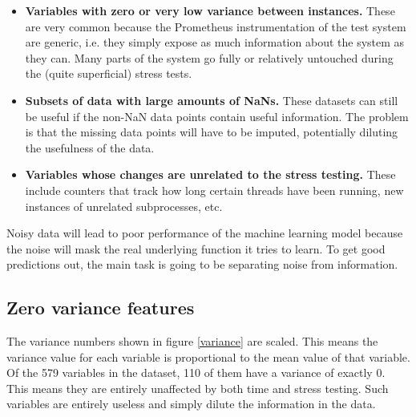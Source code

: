 \begin{itemize}
    \item \textbf{Variables with zero or very low variance between instances.} These are very common because the Prometheus instrumentation of the test system are generic, i.e. they simply expose as much information about the system as they can. Many parts of the system go fully or relatively untouched during the (quite superficial) stress tests.
    \item \textbf{Subsets of data with large amounts of NaNs.} These datasets can still be useful if the non-NaN data points contain useful information. The problem is that the missing data points will have to be imputed, potentially diluting the usefulness of the data. 
    \item \textbf{Variables whose changes are unrelated to the stress testing.} These include counters that track how long certain threads have been running, new instances of unrelated subprocesses, etc. 
\end{itemize}

Noisy data will lead to poor performance of the machine learning model because the noise will mask the real underlying function it tries to learn. To get good predictions out, the main task is going to be separating noise from information. 

\subsection{Zero variance features}
The variance numbers shown in figure \ref*{variance} are scaled. This means the variance value for each variable is proportional to the mean value of that variable.
Of the 579 variables in the dataset, 110 of them have a variance of exactly 0. This means they are entirely unaffected by both time and stress testing. Such variables are entirely useless and simply dilute the information in the data. 

